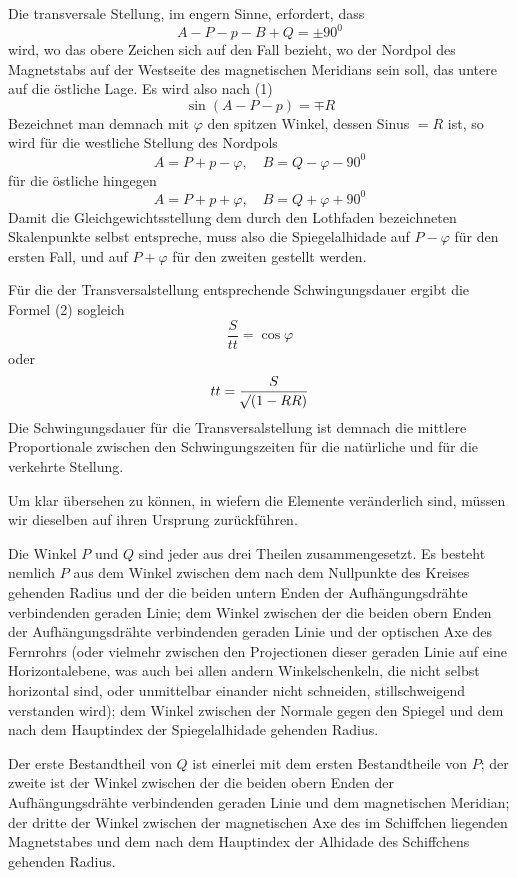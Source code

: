Die transversale Stellung, im engern Sinne, erfordert, dass
\[
A-P-p-B+Q=\pm90^0
\]
wird, wo das obere Zeichen sich auf den Fall bezieht, wo der Nordpol des Magnetstabs auf der Westseite des magnetischen Meridians sein soll, das untere auf die östliche Lage. Es wird also nach (1)
\[
\sin(A-P-p)=\mp R
\]
Bezeichnet man demnach mit $\varphi$ den spitzen Winkel, dessen Sinus $=R$ ist, so wird für die westliche Stellung des Nordpols
\[
A=P+p-\varphi,\quad B=Q-\varphi-90^0
\]
für die östliche hingegen
\[
A=P+p+\varphi,\quad B=Q+\varphi+90^0
\]
Damit die Gleichgewichtsstellung dem durch den Lothfaden bezeichneten Skalenpunkte selbst entspreche, muss also die Spiegelalhidade auf $P-\varphi$ für den ersten Fall, und auf $P+\varphi$ für den zweiten gestellt werden.

Für die der Transversalstellung entsprechende Schwingungsdauer ergibt die Formel (2) sogleich
\[
\frac{S}{tt}=\cos\varphi
\]
oder
\[
tt=\frac{S}{\mathord{{}^{}\!\surd}(1-RR)}
\]
Die Schwingungsdauer für die Transversalstellung ist demnach die mittlere Proportionale zwischen den Schwingungszeiten für die natürliche und für die verkehrte Stellung.

Um klar übersehen zu können, in wiefern die Elemente veränderlich sind, müssen wir dieselben auf ihren Ursprung zurückführen.

Die Winkel $P$ und $Q$ sind jeder aus drei Theilen zusammengesetzt. Es besteht nemlich $P$ aus dem Winkel zwischen dem nach dem Nullpunkte des Kreises gehenden Radius und der die beiden untern Enden der Aufhängungsdrähte verbindenden geraden Linie; dem Winkel zwischen der die beiden obern Enden der Aufhängungsdrähte verbindenden geraden Linie und der optischen Axe des Fernrohrs (oder vielmehr zwischen den Projectionen dieser geraden Linie auf eine Horizontalebene, was auch bei allen andern Winkelschenkeln, die nicht selbst horizontal sind, oder unmittelbar einander nicht schneiden, stillschweigend verstanden wird); dem Winkel zwischen der Normale gegen den Spiegel und dem nach dem Hauptindex der Spiegelalhidade gehenden Radius.

Der erste Bestandtheil von $Q$ ist einerlei mit dem ersten Bestandtheile von $P$; der zweite ist der Winkel zwischen der die beiden obern Enden der Aufhängungsdrähte verbindenden geraden Linie und dem magnetischen Meridian; der dritte der Winkel zwischen der magnetischen Axe des im Schiffchen liegenden Magnetstabes und dem nach dem Hauptindex der Alhidade des Schiffchens gehenden Radius.

